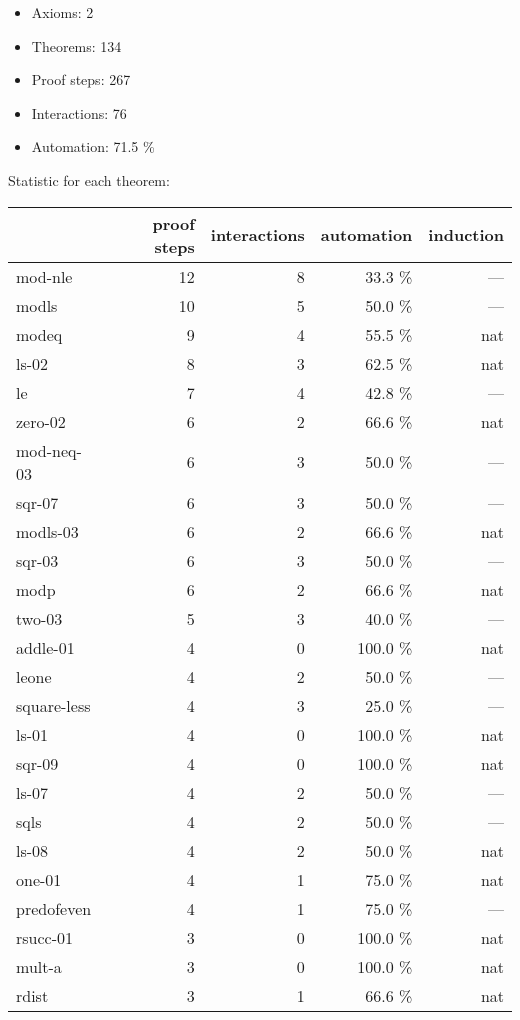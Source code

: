 \documentclass[a4paper]{article}
\begin{document}
\raggedright
              
\begin{itemize}
\item Axioms: 2
\item Theorems: 134
\item Proof steps: 267
\item Interactions: 76
\item Automation: 71.5 \%
\end{itemize}


Statistic for each theorem:

\begin{supertabular}{l|r|r|r|r}
	& proof steps & interactions & automation & induction\\ \hline
mod-nle & 12 & 8 & 33.3 \% & ---\\
modls & 10 & 5 & 50.0 \% & ---\\
modeq & 9 & 4 & 55.5 \% & nat\\
ls-02 & 8 & 3 & 62.5 \% & nat\\
le & 7 & 4 & 42.8 \% & ---\\
zero-02 & 6 & 2 & 66.6 \% & nat\\
mod-neq-03 & 6 & 3 & 50.0 \% & ---\\
sqr-07 & 6 & 3 & 50.0 \% & ---\\
modls-03 & 6 & 2 & 66.6 \% & nat\\
sqr-03 & 6 & 3 & 50.0 \% & ---\\
modp & 6 & 2 & 66.6 \% & nat\\
two-03 & 5 & 3 & 40.0 \% & ---\\
addle-01 & 4 & 0 & 100.0 \% & nat\\
leone & 4 & 2 & 50.0 \% & ---\\
square-less & 4 & 3 & 25.0 \% & ---\\
ls-01 & 4 & 0 & 100.0 \% & nat\\
sqr-09 & 4 & 0 & 100.0 \% & nat\\
ls-07 & 4 & 2 & 50.0 \% & ---\\
sqls & 4 & 2 & 50.0 \% & ---\\
ls-08 & 4 & 2 & 50.0 \% & nat\\
one-01 & 4 & 1 & 75.0 \% & nat\\
predofeven & 4 & 1 & 75.0 \% & ---\\
rsucc-01 & 3 & 0 & 100.0 \% & nat\\
mult-a & 3 & 0 & 100.0 \% & nat\\
rdist & 3 & 1 & 66.6 \% & nat\\

\end{supertabular}
\end{document}
